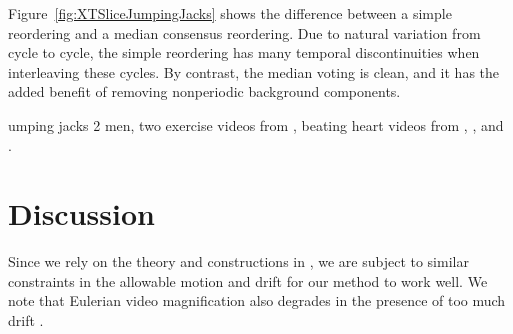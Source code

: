 \documentclass{article}
\begin{document}
Figure~\ref{fig:XTSliceJumpingJacks} shows the difference between a simple reordering and a median consensus reordering.  Due to natural variation from cycle to cycle, the simple reordering has many temporal discontinuities when interleaving these cycles.  By contrast, the median voting is clean, and it has the added benefit of removing nonperiodic background components.

umping jacks 2 men, two exercise videos from \cite{levy2015live}, beating heart videos from \cite{traliehigh}, \cite{wu2012eulerian}, and \cite{wadhwa2013phase}.

\section{Discussion}

Since we rely on the theory and constructions in \cite{tralie2017quasi}, we are subject to similar constraints in the allowable motion and drift for our method to work well.  We note that Eulerian video magnification also degrades in the presence of too much drift \cite{wu2012eulerian, wadhwa2013phase}.




\end{document}
